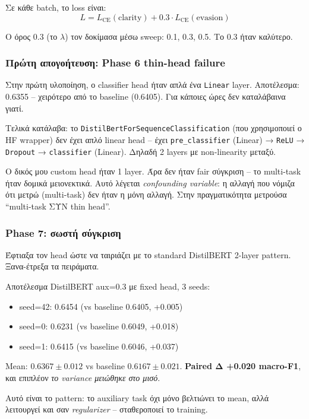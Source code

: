 \documentclass[12pt]{fphw}
\begin{document}
Σε κάθε batch, το loss είναι:
\[
L = L_{\text{CE}}(\text{clarity}) + 0.3 \cdot L_{\text{CE}}(\text{evasion})
\]

Ο όρος 0.3 (το $\lambda$) τον δοκίμασα μέσω sweep: 0.1, 0.3, 0.5. Το 0.3 ήταν καλύτερο.

\subsubsection{Πρώτη απογοήτευση: Phase 6 thin-head failure}

Στην πρώτη υλοποίηση, ο classifier head ήταν απλά ένα \texttt{Linear} layer. Αποτέλεσμα: 0.6355 -- χειρότερο από το baseline (0.6405). Για κάποιες ώρες δεν καταλάβαινα γιατί.

Τελικά κατάλαβα: το \texttt{DistilBertForSequenceClassification} (που χρησιμοποιεί ο HF wrapper) δεν έχει απλό linear head -- έχει \texttt{pre\_classifier} (Linear) → \texttt{ReLU} → \texttt{Dropout} → \texttt{classifier} (Linear). Δηλαδή 2 layers με non-linearity μεταξύ.

Ο δικός μου custom head ήταν 1 layer. Άρα δεν ήταν fair σύγκριση -- το multi-task ήταν δομικά μειονεκτικά. Αυτό λέγεται \emph{confounding variable}: η αλλαγή που νόμιζα ότι μετρώ (multi-task) δεν ήταν η μόνη αλλαγή. Στην πραγματικότητα μετρούσα ``multi-task ΣΥΝ thin head''.

\subsubsection{Phase 7: σωστή σύγκριση}

Έφτιαξα τον head ώστε να ταιριάζει με το standard DistilBERT 2-layer pattern. Ξανα-έτρεξα τα πειράματα.

Αποτέλεσμα DistilBERT aux=0.3 με fixed head, 3 seeds:
\begin{itemize}
    \item seed=42: 0.6454 (vs baseline 0.6405, +0.005)
    \item seed=0: 0.6231 (vs baseline 0.6049, +0.018)
    \item seed=1: 0.6415 (vs baseline 0.6046, +0.037)
\end{itemize}

Mean: $0.6367 \pm 0.012$ vs baseline $0.6167 \pm 0.021$. \textbf{Paired Δ +0.020 macro-F1}, και επιπλέον \emph{το variance μειώθηκε στο μισό}.

Αυτό είναι το pattern: το auxiliary task όχι μόνο βελτιώνει το mean, αλλά λειτουργεί και σαν \emph{regularizer} -- σταθεροποιεί το training.
\end{document}
